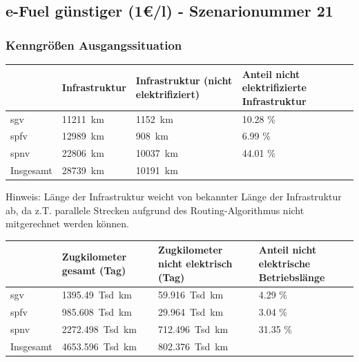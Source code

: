 \subsection{e-Fuel günstiger (1€/l) - Szenarionummer 21}\label{chap_kenngrößen_s_21}

\subsubsection{Kenngrößen Ausgangssituation}
\begin{center}
	\begin{tabularx}{\textwidth}{l | X | X | X} & Infrastruktur & Infrastruktur (nicht elektrifiziert) & Anteil nicht elektrifizierte Infrastruktur \\
	\hline
	\acrshort{sgv} & \SI{11211}{\km} & \SI{1152}{\km} & \num{10.28} \% \\
	\acrshort{spfv} & \SI{12989}{\km} & \SI{908}{\km} & \num{6.99} \% \\
	\acrshort{spnv} & \SI{22806}{\km} & \SI{10037}{\km} & \num{44.01} \% \\
	\hline
	Insgesamt & \SI{28739}{\km} & \SI{10191}{\km} & \\
	\end{tabularx}
\end{center}
\hspace{2em}

Hinweis: Länge der Infrastruktur weicht von bekannter Länge der Infrastruktur ab, da z.T. parallele Strecken aufgrund des Routing-Algorithmus nicht mitgerechnet werden können.

\begin{center}
	\begin{tabularx}{\textwidth}{l | X | X | X} & Zugkilometer gesamt (Tag) & Zugkilometer nicht elektrisch (Tag) & Anteil nicht elektrische Betriebslänge \\
	\hline
	\acrshort{sgv} & \SI{1395.49}{Tsd. \km} & \SI{59.916}{Tsd. \km} & \num{4.29}  \% \\
	\acrshort{spfv} & \SI{985.608}{Tsd. \km} & \SI{29.964}{Tsd. \km} & \num{3.04} \% \\
	\acrshort{spnv} & \SI{2272.498}{Tsd. \km} & \SI{712.496}{Tsd. \km} & \num{31.35} \% \\
	\hline
	Insgesamt & \SI{4653.596}{Tsd. \km} & \SI{802.376}{Tsd. \km} & \\
	\end{tabularx}
\end{center}


